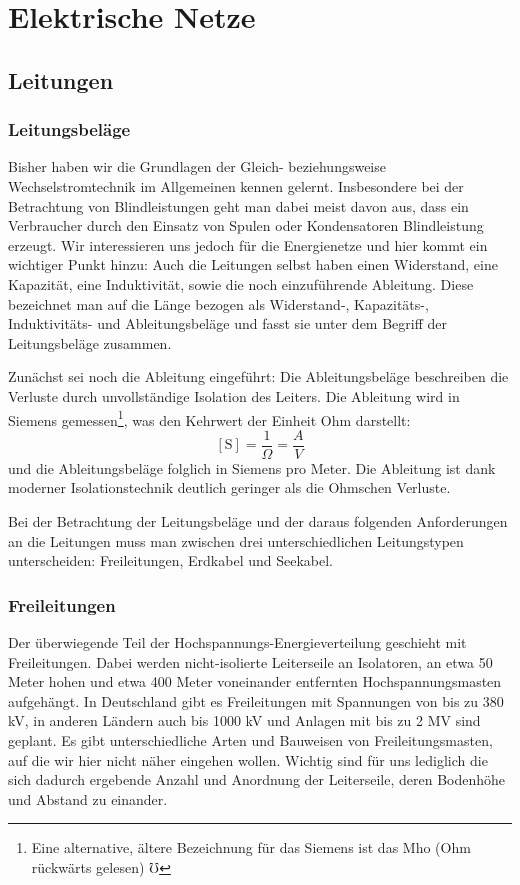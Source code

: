 \section{Elektrische Netze}

\subsection{Leitungen}

\subsubsection{Leitungsbeläge}
Bisher haben wir die Grundlagen der Gleich- beziehungsweise Wechselstromtechnik im Allgemeinen kennen gelernt.
Insbesondere bei der Betrachtung von Blindleistungen geht man dabei meist davon aus,
dass ein Verbraucher durch den Einsatz von Spulen oder Kondensatoren Blindleistung erzeugt.
Wir interessieren uns jedoch für die Energienetze und hier kommt ein wichtiger Punkt hinzu:
Auch die Leitungen selbst haben einen Widerstand, eine Kapazität, eine Induktivität, sowie die noch einzuführende Ableitung.
Diese bezeichnet man auf die Länge bezogen als Widerstand-, Kapazitäts-, Induktivitäts- und Ableitungsbeläge und fasst sie unter dem Begriff der Leitungsbeläge zusammen.

Zunächst sei noch die Ableitung eingeführt: Die Ableitungsbeläge beschreiben die Verluste durch unvollständige Isolation des Leiters. Die Ableitung wird in Siemens gemessen\footnote{Eine alternative, ältere Bezeichnung für das Siemens ist das Mho (Ohm rückwärts gelesen) $\mho$ }, was den Kehrwert der Einheit Ohm darstellt:
\begin{equation}
\mathrm{[S]} = \frac{1}{\Omega} = \frac{A}{V}
\end{equation}
und die Ableitungsbeläge folglich in Siemens pro Meter.
Die Ableitung ist dank moderner Isolationstechnik deutlich geringer als die Ohmschen Verluste.

Bei der Betrachtung der Leitungsbeläge und der daraus folgenden Anforderungen an die Leitungen muss man zwischen drei unterschiedlichen Leitungstypen unterscheiden: Freileitungen, Erdkabel und Seekabel.

\subsubsection{Freileitungen}
Der überwiegende Teil der Hochspannungs-Energieverteilung geschieht mit Freileitungen.
Dabei werden nicht-isolierte Leiterseile an Isolatoren, an etwa 50 Meter hohen und etwa 400 Meter voneinander entfernten Hochspannungsmasten aufgehängt.
In Deutschland gibt es Freileitungen mit Spannungen von bis zu 380 kV, in anderen Ländern auch bis 1000 kV und Anlagen mit bis zu 2 MV sind geplant\cite{Flosdorff}.
Es gibt unterschiedliche Arten und Bauweisen von Freileitungsmasten, auf die wir hier nicht näher eingehen wollen. Wichtig sind für uns lediglich die sich dadurch ergebende Anzahl und Anordnung der Leiterseile, deren Bodenhöhe und Abstand zu einander.

